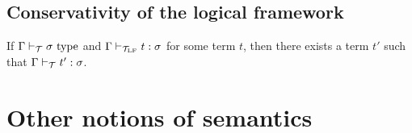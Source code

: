 \documentclass[a4paper]{article}
\begin{document}
\subsection{Conservativity of the logical framework}\label{sec:cotlf}

\begin{proposition}[Conservativity]
  If $\Gamma \mathrel{\vdash_{\mathcal{T}}} \sigma~\mathrm{type}$ and $\Gamma \mathrel{\vdash_{\mathcal{T}_{\mathrm{LF}}}} t : \sigma$ for some term $t$, then there exists a term $t'$ such that $\Gamma \mathrel{\vdash_{\mathcal{T}}} t' : \sigma$.
\end{proposition}

\section{Other notions of semantics}\label{sec:onos}



\end{document}
